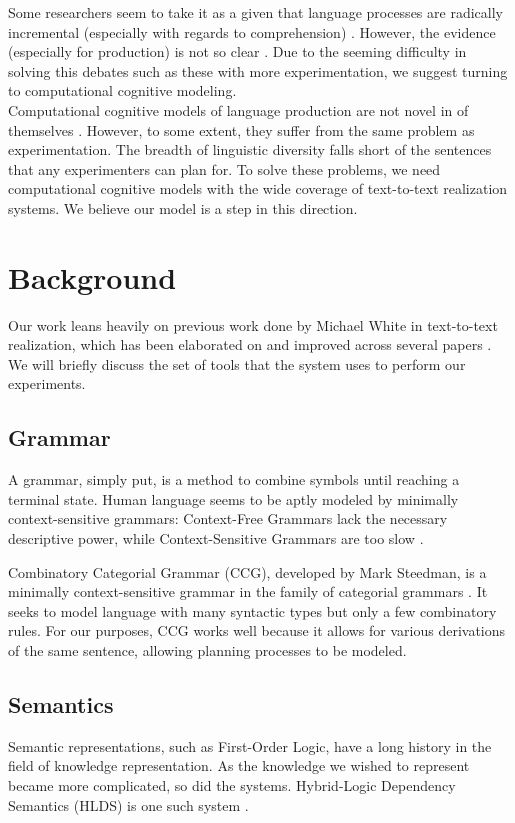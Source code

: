\documentclass[11pt]{article}
\begin{document}
\indent Some researchers seem to take it as a given that language processes are radically incremental (especially with regards to comprehension) \citep{tag1}\citep{radical}. However, the evidence (especially for production) is not so clear \citep{incremental}. Due to the seeming difficulty in solving this debates such as these with more experimentation, we suggest turning to computational cognitive modeling.\\ 
\indent Computational cognitive models of language production are not novel in of themselves \citep{reitter2011syntacticpriming}. However, to some extent, they suffer from the same problem as experimentation. The breadth of linguistic diversity falls short of the sentences that any experimenters can plan for. To solve these problems, we need computational cognitive models with the wide coverage of text-to-text realization systems. We believe our model is a step in this direction.

\section{Background}
Our work leans heavily on previous work done by Michael White in text-to-text realization, which has been elaborated on and improved across several papers \citep{chart} \citep{chart-dep} \citep{chart-dlf}. We will briefly discuss the set of tools that the system uses to perform our experiments.

\subsection{Grammar}
A grammar, simply put, is a method to combine symbols until reaching a terminal state. Human language seems to be aptly modeled by minimally context-sensitive grammars: Context-Free Grammars lack the necessary descriptive power, while Context-Sensitive Grammars are too slow \citep{convergence}.

Combinatory Categorial Grammar (CCG), developed by Mark Steedman, is a minimally context-sensitive grammar in the family of categorial grammars \citep{ccg}. It seeks to model language with many syntactic types but only a few combinatory rules. For our purposes, CCG works well because it allows for various derivations of the same sentence, allowing planning processes to be modeled.  

\subsection{Semantics}
Semantic representations, such as First-Order Logic, have a long history in the field of knowledge representation. As the knowledge we wished to represent became more complicated, so did the systems. Hybrid-Logic Dependency Semantics (HLDS) is one such system \citep{hlds1}.
\end{document}
